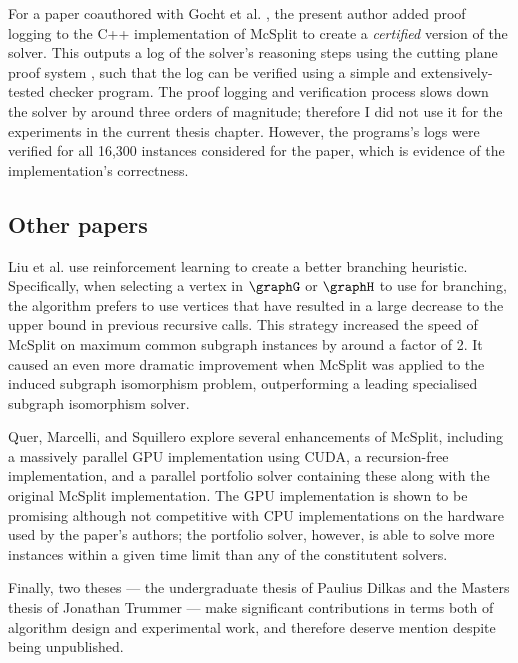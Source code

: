 For a paper coauthored with Gocht et al. \cite{DBLP:conf/cp/GochtMMNPT20}, the present
author added proof logging \cite{DBLP:conf/ijcai/GochtMN20} to the C++ implementation of
McSplit to create a \emph{certified} version of the solver.  This outputs a log of the
solver's reasoning steps using the cutting plane proof system
\cite{DBLP:journals/dam/CookCT87}, such that the log can be verified using a
simple and extensively-tested checker program.  The proof logging and verification process
slows down the solver by around three orders of magnitude; therefore I did not use it for
the experiments in the current thesis chapter.  However, the programs's logs were verified
for all 16,300 instances considered for the paper, which is evidence of the implementation's
correctness.

\subsection{Other papers}

Liu et al. \cite{DBLP:conf/aaai/0001LJ020} use reinforcement learning to create a better branching
heuristic.  Specifically, when selecting a vertex in $\graphG$ or $\graphH$ to use for branching,
the algorithm prefers to use vertices that have resulted in a large decrease to the upper bound
in previous recursive calls.  This strategy increased the speed of McSplit on maximum common subgraph
instances by around a factor of 2.  It caused an even more dramatic improvement when McSplit was
applied to the induced subgraph isomorphism problem, outperforming a leading specialised subgraph
isomorphism solver.

Quer, Marcelli, and Squillero \cite{DBLP:journals/computation/QuerMS20}
explore several enhancements of McSplit,
including a massively parallel GPU implementation using CUDA, a recursion-free implementation,
and a parallel portfolio solver containing these along with the original McSplit
implementation.  The GPU implementation is shown to be promising although not competitive
with CPU implementations on the hardware used by the paper's authors; the portfolio solver,
however, is able to solve more instances within a given time limit than any of the
constitutent solvers.

Finally, two theses --- the undergraduate thesis of Paulius Dilkas and
the Masters thesis of Jonathan Trummer --- make significant contributions
in terms both of algorithm design and experimental work, and therefore
deserve mention despite being unpublished.

